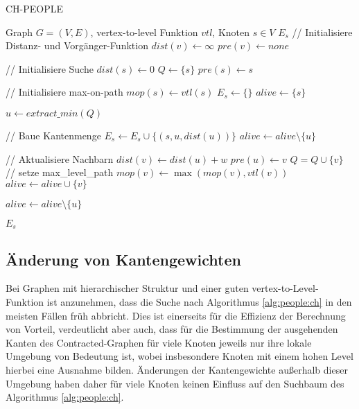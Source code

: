 \begin{algorithm}[p]
  \caption{CH-PEOPLE}
  \begin{algorithmic}[1]
    \Require Graph $G = (V, E)$, vertex-to-level Funktion ${vtl}$, Knoten $s \in V$
    \Ensure $E_s$
    \State // Initialisiere Distanz- und Vorgänger-Funktion
    \State ${dist}(v) \leftarrow \infty$
    \State ${pre}(v) \leftarrow {none}$
    \EndFor

    \State
    \State // Initialisiere Suche
    \State ${dist}(s) \leftarrow 0$
    \State $Q\leftarrow \{ s \}$
    \State ${pre}(s) \leftarrow s$

    \State
    \State // Initialisiere max-on-path
    \State ${mop}(s) \leftarrow {vtl}(s)$
    \State $E_s \leftarrow \{ \}$
    \State ${alive} \leftarrow \{ s \}$

    \State
    \State $u \leftarrow{extract\_min}(Q)$\label{graphs:dijkstra:pop}

    \State
    \State // Baue Kantenmenge
    \State $E_s \leftarrow E_s \cup \{ (s, u, {dist}(u)) \}$
    \State ${alive} \leftarrow {alive} \setminus \{ u \}$
    \EndIf

    \State
    \State // Aktualisiere Nachbarn
    \State ${dist}(v) \leftarrow {dist}(u) + w$
    \State ${pre}(u) \leftarrow v$
    \State $Q = Q \cup \{ v \}$
    \State
    \State // setze max\_level\_path
    \State ${mop}(v) \leftarrow \max({mop}(v), {vtl}(v))$
    \State
    \State ${alive} \leftarrow {alive} \cup \{ v \}$
    \EndIf
    \EndIf
    \EndFor

    \State ${alive} \leftarrow {alive} \setminus \{ u \}$

    \EndWhile

    \State
    \State \Return $E_s$
  \end{algorithmic}
  \label{alg:people:ch}
\end{algorithm}

\subsection{Änderung von Kantengewichten}

Bei Graphen mit hierarchischer Struktur und einer guten vertex-to-Level-Funktion ist anzunehmen, dass die Suche nach Algorithmus \ref{alg:people:ch}  in den meisten Fällen früh abbricht.
Dies ist einerseits für die Effizienz der Berechnung von Vorteil, verdeutlicht aber auch, dass für die Bestimmung der ausgehenden Kanten des Contracted-Graphen für viele Knoten jeweils nur ihre lokale Umgebung von Bedeutung ist, wobei insbesondere Knoten mit einem hohen Level hierbei eine Ausnahme bilden.
Änderungen der Kantengewichte außerhalb dieser Umgebung haben daher für viele Knoten keinen Einfluss auf den Suchbaum des Algorithmus \ref{alg:people:ch}.

